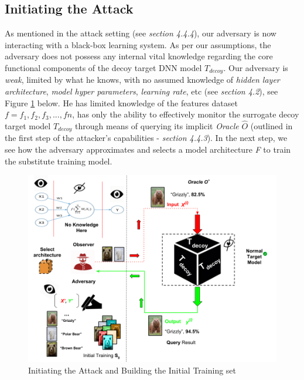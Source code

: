 \documentclass[grad,lot,lof,11pt,oneside,onehalfspace]{RUthesis}
\begin{document}
\subsection{Initiating the Attack}
As mentioned in the attack setting (see \textit{section 4.4.4}), our adversary is now interacting with a black-box learning system. As per our assumptions, the adversary does not possess any internal vital knowledge regarding the core functional components of the decoy target DNN model \textit{$T_{decoy}$}. Our adversary is \textit{weak}, limited by what he knows, with no assumed knowledge of \textit{hidden layer architecture}, \textit{model hyper parameters}, \textit{learning rate}, etc (see \textit{section 4.2}), see Figure \ref{fig:Initiate} below. He has limited knowledge of the features dataset \textit{$f={f_{1}, f_{2}, f_{3},..., fn}$}, has only the ability to effectively monitor the surrogate decoy target model \textit{$T_{decoy}$} through means of querying its implicit \textit{Oracle} \textit{$\hat{O}$} (outlined in the first step of the attacker's capabilities - \textit{section 4.4.3}). In the next step, we see how the adversary approximates and selects a model architecture \textit{F} to train the substitute training model.
\begin{figure}[h]
\centering
\includegraphics[width=0.9\linewidth]{"Images/Chapter 4/Initiate"}
\caption{Initiating the Attack and Building the Initial Training set}
\label{fig:Initiate}
\end{figure}
\end{document}

